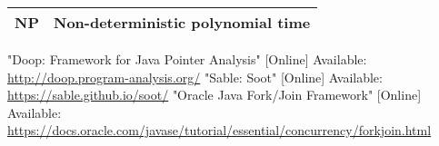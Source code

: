 \documentclass{dithesis}
\begin{document}
\begin{thesisabbreviations}[ABBREVIATIONS]
	\begin{tabularx}{\textwidth}{|X|X|}
		\hline
		NP & Non-deterministic polynomial time \\
		\hline
	\end{tabularx}
\end{thesisabbreviations}


\begin{thesisbibliography}[REFERENCES]{99}
		"Doop: Framework for Java Pointer Analysis"
		[Online]
		Available: \url{http://doop.program-analysis.org/}
		"Sable: Soot"
		[Online]
		Available: \url{https://sable.github.io/soot/}
		"Oracle Java Fork/Join Framework"
		[Online]
		Available: \url{https://docs.oracle.com/javase/tutorial/essential/concurrency/forkjoin.html}
\end{thesisbibliography}
\end{document}
